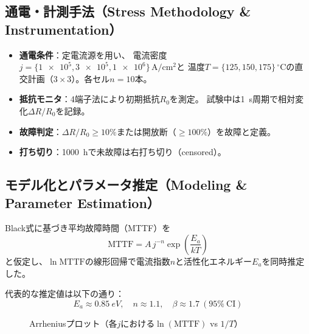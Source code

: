 \documentclass[conference]{IEEEtran}
\begin{document}
\subsection{通電・計測手法（Stress Methodology \& Instrumentation）}
\begin{itemize}
  \item \textbf{通電条件}：定電流源を用い、
        電流密度$j=\{ \SI{1e5}, \SI{3e5}, \SI{1e6}\}\,\si{\ampere\per\centi\meter\squared}$と
        温度$T=\{ \SI{125}, \SI{150}, \SI{175}\}\,^\circ\mathrm{C}$の直交計画（$3\times 3$）。各セル$n=10$本。
  \item \textbf{抵抗モニタ}：4端子法により初期抵抗$R_0$を測定。
        試験中は\SI{1}{s}周期で相対変化$\Delta R/R_0$を記録。
  \item \textbf{故障判定}：$\Delta R/R_0 \ge 10\%$または開放断（$\ge 100\%$）を故障と定義。
  \item \textbf{打ち切り}：\SI{1000}{h}で未故障は右打ち切り（censored）。
\end{itemize}

\subsection{モデル化とパラメータ推定（Modeling \& Parameter Estimation）}
Black式\cite{Black}に基づき平均故障時間（MTTF）を
\begin{equation}
  \mathrm{MTTF} = A \, j^{-n}\exp\!\left(\frac{E_a}{kT}\right)
\end{equation}
と仮定し、$\ln \mathrm{MTTF}$の線形回帰で電流指数$n$と活性化エネルギー$E_a$を同時推定した。

代表的な推定値は以下の通り：
\[
  E_a \approx \SI{0.85}{eV}, \quad
  n \approx 1.1, \quad
  \beta \approx 1.7 \ (95\% \ \mathrm{CI})
\]

\begin{figure}[htbp]
  \centering
  \caption{Arrheniusプロット（各$j$における$\ln(\mathrm{MTTF})$ vs $1/T$）}
  \label{fig:em-arr}
\end{figure}
\end{document}
